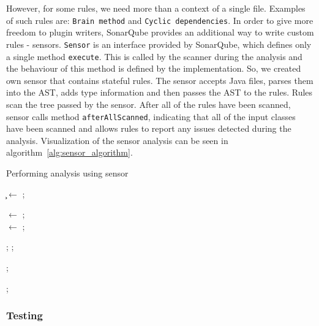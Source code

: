 However, for some rules, we need more than a context of a single file.
Examples of such rules are: \verb|Brain method| and \verb|Cyclic dependencies|.
In order to give more freedom to plugin writers, SonarQube provides an additional way to write custom rules - sensors.
\verb|Sensor| is an interface provided by SonarQube, which defines only a single method \verb|execute|.
This is called by the scanner during the analysis and the behaviour of this method is defined by the implementation.
So, we created own sensor that contains stateful rules.
The sensor accepts Java files, parses them into the AST, adds type information and then passes the AST to the rules.
Rules scan the tree passed by the sensor.
After all of the rules have been scanned, sensor calls method \verb|afterAllScanned|, indicating that all of the
input classes have been scanned and allows rules to report any issues detected during the analysis.
Visualization of the sensor analysis can be seen in algorithm~\ref{alg:sensor_algorithm}.

\begin{algorithm} [!htb]
    \caption{Performing analysis using sensor}
    \label{alg:sensor_algorithm}
    \BlankLine

    \c$\leftarrow$ \CreateClassPath; \\

     {
        \AST$\leftarrow$ \ParseJavaFile { \j }; \\
        \AstWithSymbolicModel$\leftarrow$ \UpdateSymbolicModel{\j, \c};

         {
            \Scan{\r, \AstWithSymbolicModel};
        };
    }

     {
        \AfterAllScanned{};
    }

    \UploadResults{};
\end{algorithm}

\FloatBarrier

\subsubsection{Testing}

